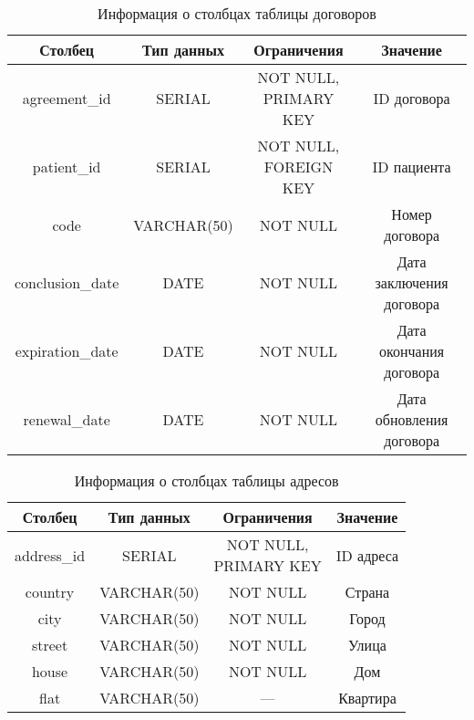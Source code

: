 \begin{table}[H]
\begin{center}
	\captionsetup{justification=raggedright,singlelinecheck=off,margin=5mm}
	\caption{Информация о столбцах таблицы договоров}
	\begin{tabular}{| c | c | c | c |}
		\hline
		Столбец & Тип данных & Ограничения & Значение \\
		\hline
		agreement\_id & SERIAL & \makecell{NOT NULL, \\ PRIMARY KEY} & ID договора \\
		\hline
		patient\_id & SERIAL & \makecell{NOT NULL, \\ FOREIGN KEY} & ID пациента \\
		\hline
		code & VARCHAR(50) & NOT NULL & Номер договора \\
		\hline
		conclusion\_date & DATE & NOT NULL & \makecell{Дата заключения \\договора}\\
		\hline
		expiration\_date & DATE & NOT NULL & \makecell{Дата окончания\\договора} \\
		\hline
		renewal\_date & DATE & NOT NULL & \makecell{Дата обновления \\договора} \\
		\hline
	\end{tabular}
	\label{table:argreements-columns}
\end{center}
\end{table}

\begin{table}[H]
\begin{center}
	\captionsetup{justification=raggedright,singlelinecheck=off,margin=5mm}
	\caption{Информация о столбцах таблицы адресов}
	\begin{tabular}{| c | c | c | c |}
		\hline
		Столбец & Тип данных & Ограничения & Значение \\
		\hline
		address\_id & SERIAL & \makecell{NOT NULL, \\ PRIMARY KEY} & ID адреса \\
		\hline
		country & VARCHAR(50) & NOT NULL & Страна \\
		\hline
		city & VARCHAR(50) & NOT NULL & Город \\
		\hline
		street & VARCHAR(50) & NOT NULL & Улица \\
		\hline
		house & VARCHAR(50) & NOT NULL & Дом \\
		\hline
		flat & VARCHAR(50) & --- & Квартира \\
		\hline
	\end{tabular}
	\label{table:addresses-columns}
\end{center}
\end{table}

